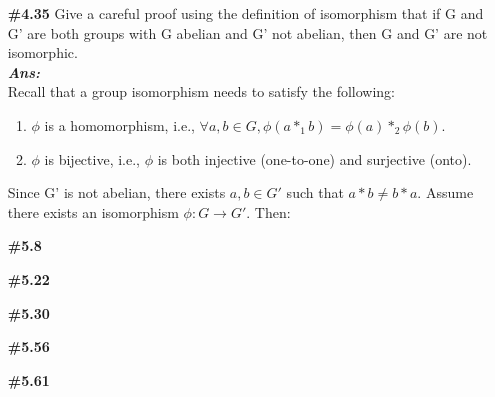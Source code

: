 \documentclass[12pt]{article}
\newcommand{\sol}{\setlength{\parindent}{0cm}\textbf{\textit{Ans:}}\setlength{\parindent}{1cm} }
\begin{document}
\begin{enumerate}[start=1,label={\bfseries Question \arabic*:},leftmargin=1in]
  \sol{}\\
  Recall that a permutation is one-to-one and onto function. Thus, we check these two properties.
  \begin{enumerate}
    \item \( f_3 \) is one-to-one: \\
    Assume \( f_3(x) = f_3(y) \), then \( -x^3 = -y^3 \) implies \( x = y \). Thus, \( f_3 \) is one-to-one.
    \item \( f_3 \) is onto: \\
    For any \( y \in \mathbb{R} \), we can find \( x = -\sqrt[3]{y} \in \mathbb{R} \) such that \\
    \( f_3(x) = -x^3 = -(-\sqrt[3]{y})^3 = y \). Thus, \( f_3 \) is onto.
  \end{enumerate}
  So since \( f_3 \) is one-to-one and onto, it is a permutation.
  \item[\textbf{\#4.35}] Give a careful proof using the definition of isomorphism that if G and G' are both groups with G abelian and
  G' not abelian, then G and G' are not isomorphic.\\
  \sol{}\\
  Recall that a group isomorphism needs to satisfy the following:
  \begin{enumerate}
    \item $\phi$ is a homomorphism, i.e., $\forall a, b \in G, \phi(a *_1 b) = \phi(a) *_2 \phi(b)$.
    \item $\phi$ is bijective, i.e., $\phi$ is both injective (one-to-one) and surjective (onto).
  \end{enumerate} 
  Since G' is not abelian, there exists \( a, b \in G' \) such that \( a * b \neq b * a \). Assume there exists an isomorphism \( \phi: G \to G' \). Then:
  
  \item[\textbf{\#5.8}] 
  \item[\textbf{\#5.22}] 
  \item[\textbf{\#5.30}] 
  \item[\textbf{\#5.56}] 
  \item[\textbf{\#5.61}] 

\end{enumerate}
\end{document}
